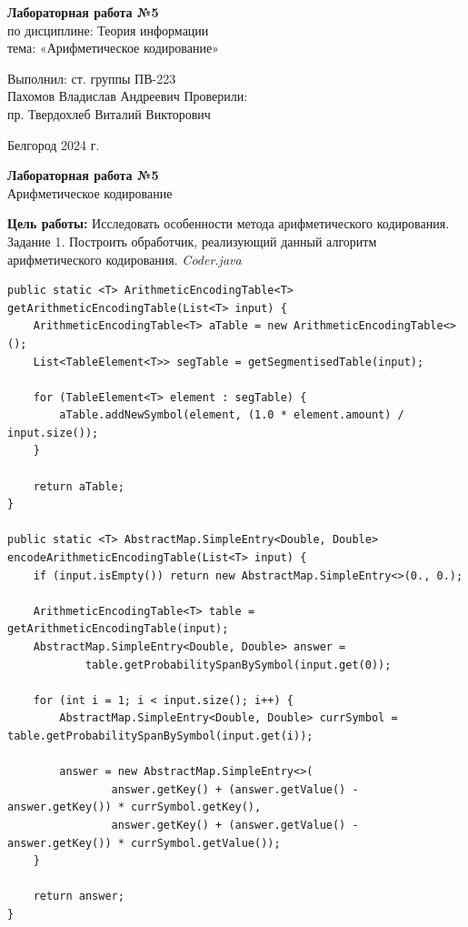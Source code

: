 \documentclass[a4paper,14pt]{extarticle}
\newcommand\textbox[1]{
	\parbox{.45\textwidth}{#1}
}
\begin{document}
\vfill
\begin{center}
    \large{
        \textbf{
            Лабораторная работа №5}}\\
    \normalsize{
        по дисциплине: Теория информации \\
        тема: «Арифметическое кодирование»}
\end{center}
\vfill
\hfill\textbox{
    Выполнил: ст. группы ПВ-223\\Пахомов Владислав Андреевич
    \bigbreak
    Проверили: \\пр. Твердохлеб Виталий Викторович
}
\vfill\begin{center}
    Белгород 2024 г.
\end{center}
\newpage
\begin{center}
    \textbf{Лабораторная работа №5}\\
    Арифметическое кодирование\\
\end{center}
\textbf{Цель работы: }Исследовать особенности метода арифметического кодирования.\\
Задание 1. Построить обработчик, реализующий данный алгоритм арифметического кодирования.
\textit{Coder.java}
\begin{verbatim}
public static <T> ArithmeticEncodingTable<T> getArithmeticEncodingTable(List<T> input) {
    ArithmeticEncodingTable<T> aTable = new ArithmeticEncodingTable<>();
    List<TableElement<T>> segTable = getSegmentisedTable(input);

    for (TableElement<T> element : segTable) {
        aTable.addNewSymbol(element, (1.0 * element.amount) / input.size());
    }

    return aTable;
}

public static <T> AbstractMap.SimpleEntry<Double, Double> encodeArithmeticEncodingTable(List<T> input) {
    if (input.isEmpty()) return new AbstractMap.SimpleEntry<>(0., 0.);

    ArithmeticEncodingTable<T> table = getArithmeticEncodingTable(input);
    AbstractMap.SimpleEntry<Double, Double> answer =
            table.getProbabilitySpanBySymbol(input.get(0));

    for (int i = 1; i < input.size(); i++) {
        AbstractMap.SimpleEntry<Double, Double> currSymbol = table.getProbabilitySpanBySymbol(input.get(i));

        answer = new AbstractMap.SimpleEntry<>(
                answer.getKey() + (answer.getValue() - answer.getKey()) * currSymbol.getKey(),
                answer.getKey() + (answer.getValue() - answer.getKey()) * currSymbol.getValue());
    }

    return answer;
}
\end{verbatim}
\end{document}
